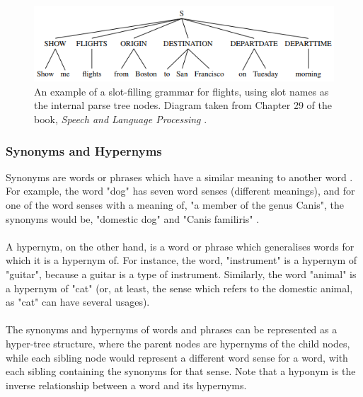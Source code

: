 \documentclass[11pt]{article}
\begin{document}
\begin{center}
\begin{figure}[H]
\begin{center}
  \includegraphics[scale=1]{slot-filling.png}
  \caption{An example of a slot-filling grammar for flights, using slot names as the internal parse tree nodes. Diagram taken from Chapter 29 of the book, \textit{Speech and Language Processing} \cite{RefWorks:107}.}
  \end{center}
\end{figure}
\end{center}


\subsubsection{Synonyms and Hypernyms}

Synonyms are words or phrases which have a similar meaning to another word  \cite{RefWorks:44}. For example, the word "dog" has seven word senses (different meanings), and for one of the word senses with a meaning of, "a member of the genus Canis", the synonyms would be, "domestic dog" and "Canis familiris" \cite{RefWorks:45}.
\\
\\
A hypernym, on the other hand, is a word or phrase which generalises words for which it is a hypernym of. For instance, the word, "instrument" is a hypernym of "guitar", because a guitar is a type of instrument. Similarly, the word "animal" is a hypernym of "cat" (or, at least, the sense which refers to the domestic animal, as "cat" can have several usages).
\\
\\
The synonyms and hypernyms of words and phrases can be represented as a hyper-tree structure, where the parent nodes are hypernyms of the child nodes, while each sibling node would represent a different word sense for a word, with each sibling containing the synonyms for that sense. Note that a hyponym is the inverse relationship between a word and its hypernyms.
\end{document}
